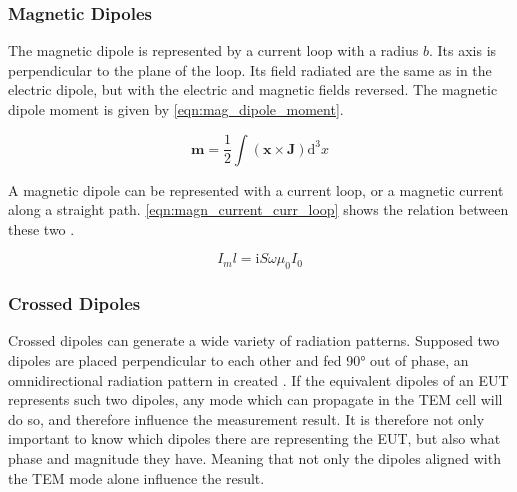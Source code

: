 \subsubsection{Magnetic Dipoles}

The magnetic dipole is represented by a current loop with a radius $b$. Its axis is perpendicular to the plane of the loop. Its field radiated are the same as in the electric dipole, but with the electric and magnetic fields reversed\cite{Balanis_1997}. The magnetic dipole moment is given by \autoref{eqn:mag_dipole_moment}.

\begin{equation}
    \mathbf{m}=\frac{1}{2}\int (\mathbf{x} \times \mathbf{J})\mathrm{d}^3x
    \label{eqn:mag_dipole_moment}
\end{equation}

A magnetic dipole can be represented with a current loop, or a magnetic current along a straight path. \autoref{eqn:magn_current_curr_loop} shows the relation between these two \cite{Balanis_1997}. 

\begin{equation}
    I_m l = \mathrm{i}S\omega\mu_0 I_0
    \label{eqn:magn_current_curr_loop}
\end{equation}


\subsubsection{Crossed Dipoles}


Crossed dipoles can generate a wide variety of radiation patterns. Supposed two dipoles are placed perpendicular to each other and fed 90° out of phase, an omnidirectional radiation pattern in created \cite{7293591}. If the equivalent dipoles of an EUT represents such two dipoles, any mode which can propagate in the TEM cell will do so, and therefore influence the measurement result. It is therefore not only important to know which dipoles there are representing the EUT, but also what phase and magnitude they have. Meaning that not only the dipoles aligned with the TEM mode alone influence the result. 


